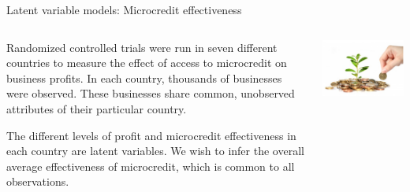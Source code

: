 \begin{frame}{Latent variable models: Microcredit effectiveness}

\begin{columns}
    \begin{column}{0.5\textwidth}
Randomized controlled trials were run in seven different countries to measure
the effect of access to microcredit on business profits.
In each country, thousands of businesses were observed.  These businesses share
common, unobserved attributes of their particular country.
\citep{meager2020aggregating}

\vspace{1em}

The different levels of profit and microcredit effectiveness in each country are
latent variables.  We wish to infer the overall average effectiveness of
microcredit, which is common to all observations.

    \end{column}
    \begin{column}{0.4\textwidth}
        \includegraphics[width=1.0\textwidth]{static_images/microcredit.png}
    \end{column}
\end{columns}


\end{frame}




